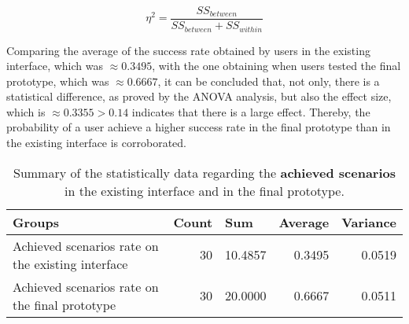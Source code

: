 \begin{equation}
  \label{eq:effect-size-formula}
  \eta^2 = \frac{SS_{between}}{SS_{between} + SS_{within}}
\end{equation}

Comparing the average of the success rate obtained by users in the existing interface, which was $\approx 0.3495$, with the one obtaining when users tested the final prototype, which was $\approx 0.6667$, it can be concluded that, not only, there is a statistical difference, as proved by the ANOVA analysis, but also the effect size, which is $\approx 0.3355 > 0.14$ indicates that there is a large effect. Thereby, the probability of a user achieve a higher success rate in the final prototype than in the existing interface is corroborated.

\begin{table}[tb]
  \caption{Summary of the statistically data regarding the \textbf{achieved scenarios} in the existing interface and in the final prototype.}
	\label{tab:statistical_summary_achieved}
  \begin{tabular}{@{}m{5cm}rrrr@{}}
  \toprule
  \textbf{Groups}                                   & \multicolumn{1}{l}{\textbf{Count}} & \multicolumn{1}{l}{\textbf{Sum}} & \multicolumn{1}{l}{\textbf{Average}} & \multicolumn{1}{l}{\textbf{Variance}} \\ \midrule
  Achieved scenarios rate on the existing interface & 30                        & 10.4857                 & 0.3495                      & 0.0519                       \\
  Achieved scenarios rate on the final prototype    & 30                        & 20.0000                 & 0.6667                      & 0.0511                       \\ \bottomrule
  \end{tabular}
  \end{table}

